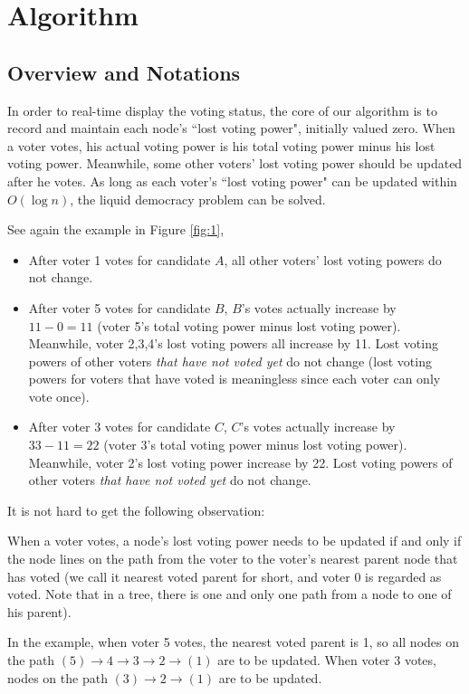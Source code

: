 \section{Algorithm}
\subsection{Overview and Notations}
In order to real-time display the voting status, the core of our algorithm is to record and maintain each node's ``lost voting power", initially valued zero. When a voter votes, his actual voting power is his total voting power minus his lost voting power. Meanwhile, some other voters' lost voting power should be updated after he votes. As long as each voter's ``lost voting power" can be updated within $O(\log n)$, the liquid democracy problem can be solved. 

See again the example in Figure \ref{fig:1}, 
\begin{itemize}
	\item After voter 1 votes for candidate $A$, all other voters' lost voting powers do not change. 
    \item After voter 5 votes for candidate $B$, $B$'s votes actually increase by $11-0=11$ (voter 5's total voting power minus lost voting power). Meanwhile, voter 2,3,4's lost voting powers all increase by 11. Lost voting powers of other voters {\em{that have not voted yet}} do not change  (lost voting powers for voters that  have voted is meaningless since each voter can only vote once).
    \item After voter 3 votes for candidate $C$, $C$'s votes actually increase by $33-11=22$ (voter 3's total voting power minus lost voting power). Meanwhile, voter 2's lost voting power increase by 22. Lost voting powers of other voters {\em{that have not voted yet}} do not change. 
\end{itemize}
It is not hard to get the following observation:
\begin{observation}
\label{obs:1}
	When a voter votes, a node's lost voting power needs to be updated if and only if the node lines on the path  from the voter to the voter's nearest parent node that has voted (we call it nearest voted parent for short, and voter 0 is regarded as voted. Note that in a tree, there is one and only one path from a node to one of his parent). 
\end{observation}
In the example, when voter 5 votes, the nearest voted parent is 1, so all nodes on the path $(5)\rightarrow4\rightarrow3\rightarrow2\rightarrow(1)$ are to be updated. When voter 3 votes, nodes on the path $(3)\rightarrow2\rightarrow(1)$ are to be updated. 

